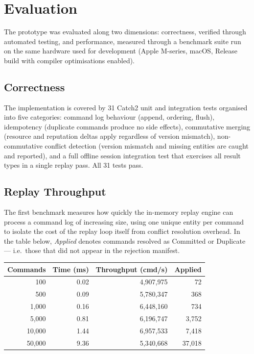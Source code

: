 \documentclass{article}
\begin{document}
\newpage

\section{Evaluation}
\label{sec:evaluation}

The prototype was evaluated along two dimensions: correctness, verified through automated testing, and performance, measured through a benchmark suite run on the same hardware used for development (Apple M-series, macOS, Release build with compiler optimisations enabled).

\subsection{Correctness}

The implementation is covered by 31 Catch2 unit and integration tests organised into five categories: command log behaviour (append, ordering, flush), idempotency (duplicate commands produce no side effects), commutative merging (resource and reputation deltas apply regardless of version mismatch), non-commutative conflict detection (version mismatch and missing entities are caught and reported), and a full offline session integration test that exercises all result types in a single replay pass. All 31 tests pass.

\subsection{Replay Throughput}

The first benchmark measures how quickly the in-memory replay engine can process a command log of increasing size, using one unique entity per command to isolate the cost of the replay loop itself from conflict resolution overhead. In the table below, \emph{Applied} denotes commands resolved as Committed or Duplicate — i.e.\ those that did not appear in the rejection manifest.

\begin{center}
\begin{tabular}{rrrr}
\hline
Commands & Time (ms) & Throughput (cmd/s) & Applied \\
\hline
100      & 0.02      & 4,907,975          & 72      \\
500      & 0.09      & 5,780,347          & 368     \\
1,000    & 0.16      & 6,448,160          & 734     \\
5,000    & 0.81      & 6,196,747          & 3,752   \\
10,000   & 1.44      & 6,957,533          & 7,418   \\
50,000   & 9.36      & 5,340,668          & 37,018  \\
\hline
\end{tabular}
\end{center}
\end{document}

